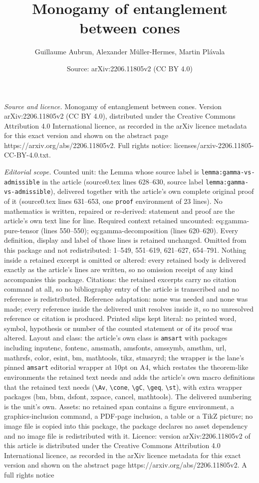 \documentclass[10pt,a4paper]{amsart}
\title[Monogamy of entanglement between cones]{Monogamy of entanglement between cones}
\author{Guillaume Aubrun, Alexander M\"uller-Hermes, Martin Pl\'avala}
\date{Source: arXiv:2206.11805v2 (CC BY 4.0)}
\begin{document}
\maketitle

\noindent\emph{Source and licence.} Monogamy of entanglement between cones. Version arXiv:2206.11805v2 (CC BY 4.0), distributed under the Creative Commons Attribution 4.0 International licence, as recorded in the arXiv licence metadata for this exact version and shown on the abstract page https://arxiv.org/abs/2206.11805v2. Full rights notice: licenses/arxiv-2206.11805-CC-BY-4.0.txt.\par\smallskip

\noindent\textit{Editorial scope.} Counted unit: the Lemma whose source label is \texttt{lemma:gamma-vs-admissible} in the article (source0.tex lines 628--630, source label \texttt{lemma:gamma-vs-admissible}), delivered together with the article's own complete original proof of it (source0.tex lines 631--653, one \texttt{proof} environment of 23 lines). No mathematics is written, repaired or re-derived: statement and proof are the article's own text line for line. Required context retained uncounted: eq:gamma-pure-tensor (lines 550--550); eq:gamma-decomposition (lines 620--620). Every definition, display and label of those lines is retained unchanged. Omitted from this package and not redistributed: 1--549, 551--619, 621--627, 654--791. Nothing inside a retained excerpt is omitted or altered: every retained body is delivered exactly as the article's lines are written, so no omission receipt of any kind accompanies this package. Citations: the retained excerpts carry no citation command at all, so no bibliography entry of the article is transcribed and no reference is redistributed. Reference adaptation: none was needed and none was made; every reference inside the delivered unit resolves inside it, so no unresolved reference or citation is produced. Printed slips kept literal: no printed word, symbol, hypothesis or number of the counted statement or of its proof was altered. Layout and class: the article's own class is \texttt{amsart} with packages including inputenc, fontenc, amsmath, amsfonts, amssymb, amsthm, url, mathrsfs, color, esint, bm, mathtools, tikz, stmaryrd; the wrapper is the lane's pinned \texttt{amsart} editorial wrapper at 10pt on A4, which restates the theorem-like environments the retained text needs and adds the article's own macro definitions that the retained text needs (\texttt{\textbackslash Av}, \texttt{\textbackslash cone}, \texttt{\textbackslash gC}, \texttt{\textbackslash geq}, \texttt{\textbackslash st}), with extra wrapper packages (bm, bbm, dsfont, xspace, cancel, mathtools). The delivered numbering is the unit's own. Assets: no retained span contains a figure environment, a graphics-inclusion command, a PDF-page inclusion, a table or a TikZ picture; no image file is copied into this package, the package declares no asset dependency and no image file is redistributed with it. Licence: version arXiv:2206.11805v2 of this article is distributed under the Creative Commons Attribution 4.0 International licence, as recorded in the arXiv licence metadata for this exact version and shown on the abstract page https://arxiv.org/abs/2206.11805v2. A full rights notice 
\end{document}
